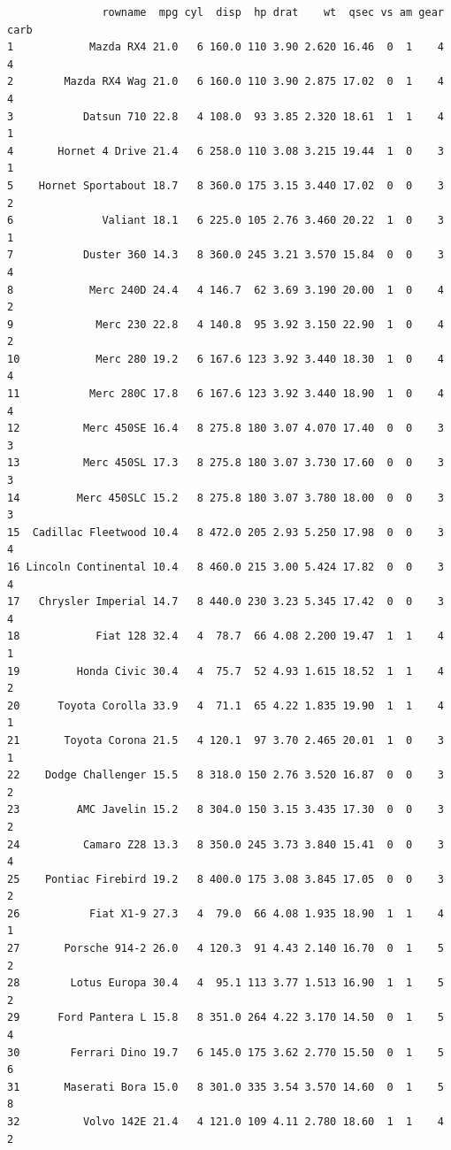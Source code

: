 \documentclass[
  letterpaper,
  DIV=11,
  numbers=noendperiod,
  oneside]{scrreprt}
\begin{document}
\begin{verbatim}
               rowname  mpg cyl  disp  hp drat    wt  qsec vs am gear carb
1            Mazda RX4 21.0   6 160.0 110 3.90 2.620 16.46  0  1    4    4
2        Mazda RX4 Wag 21.0   6 160.0 110 3.90 2.875 17.02  0  1    4    4
3           Datsun 710 22.8   4 108.0  93 3.85 2.320 18.61  1  1    4    1
4       Hornet 4 Drive 21.4   6 258.0 110 3.08 3.215 19.44  1  0    3    1
5    Hornet Sportabout 18.7   8 360.0 175 3.15 3.440 17.02  0  0    3    2
6              Valiant 18.1   6 225.0 105 2.76 3.460 20.22  1  0    3    1
7           Duster 360 14.3   8 360.0 245 3.21 3.570 15.84  0  0    3    4
8            Merc 240D 24.4   4 146.7  62 3.69 3.190 20.00  1  0    4    2
9             Merc 230 22.8   4 140.8  95 3.92 3.150 22.90  1  0    4    2
10            Merc 280 19.2   6 167.6 123 3.92 3.440 18.30  1  0    4    4
11           Merc 280C 17.8   6 167.6 123 3.92 3.440 18.90  1  0    4    4
12          Merc 450SE 16.4   8 275.8 180 3.07 4.070 17.40  0  0    3    3
13          Merc 450SL 17.3   8 275.8 180 3.07 3.730 17.60  0  0    3    3
14         Merc 450SLC 15.2   8 275.8 180 3.07 3.780 18.00  0  0    3    3
15  Cadillac Fleetwood 10.4   8 472.0 205 2.93 5.250 17.98  0  0    3    4
16 Lincoln Continental 10.4   8 460.0 215 3.00 5.424 17.82  0  0    3    4
17   Chrysler Imperial 14.7   8 440.0 230 3.23 5.345 17.42  0  0    3    4
18            Fiat 128 32.4   4  78.7  66 4.08 2.200 19.47  1  1    4    1
19         Honda Civic 30.4   4  75.7  52 4.93 1.615 18.52  1  1    4    2
20      Toyota Corolla 33.9   4  71.1  65 4.22 1.835 19.90  1  1    4    1
21       Toyota Corona 21.5   4 120.1  97 3.70 2.465 20.01  1  0    3    1
22    Dodge Challenger 15.5   8 318.0 150 2.76 3.520 16.87  0  0    3    2
23         AMC Javelin 15.2   8 304.0 150 3.15 3.435 17.30  0  0    3    2
24          Camaro Z28 13.3   8 350.0 245 3.73 3.840 15.41  0  0    3    4
25    Pontiac Firebird 19.2   8 400.0 175 3.08 3.845 17.05  0  0    3    2
26           Fiat X1-9 27.3   4  79.0  66 4.08 1.935 18.90  1  1    4    1
27       Porsche 914-2 26.0   4 120.3  91 4.43 2.140 16.70  0  1    5    2
28        Lotus Europa 30.4   4  95.1 113 3.77 1.513 16.90  1  1    5    2
29      Ford Pantera L 15.8   8 351.0 264 4.22 3.170 14.50  0  1    5    4
30        Ferrari Dino 19.7   6 145.0 175 3.62 2.770 15.50  0  1    5    6
31       Maserati Bora 15.0   8 301.0 335 3.54 3.570 14.60  0  1    5    8
32          Volvo 142E 21.4   4 121.0 109 4.11 2.780 18.60  1  1    4    2
\end{verbatim}
\end{document}
